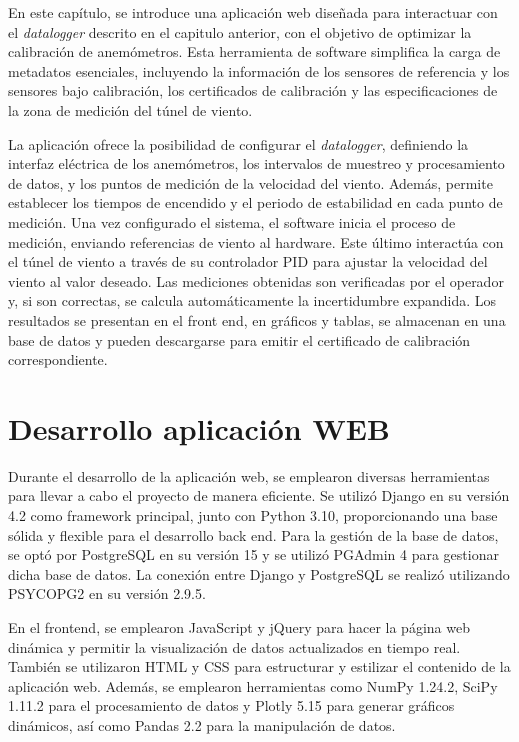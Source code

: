 En este capítulo, se introduce una aplicación web diseñada para interactuar con el \textit{datalogger} descrito en el capitulo anterior, con el objetivo de optimizar la calibración de anemómetros. Esta herramienta de software simplifica la carga de metadatos esenciales, incluyendo la información de los sensores de referencia y los sensores bajo calibración, los certificados de calibración y las especificaciones de la zona de medición del túnel de viento.

La aplicación ofrece la posibilidad de configurar el \textit{datalogger}, definiendo la interfaz eléctrica de los anemómetros, los intervalos de muestreo y procesamiento de datos, y los puntos de medición de la velocidad del viento. Además, permite establecer los tiempos de encendido y el periodo de estabilidad en cada punto de medición. Una vez configurado el sistema, el software inicia el proceso de medición, enviando referencias de viento al hardware. Este último interactúa con el túnel de viento a través de su controlador PID para ajustar la velocidad del viento al valor deseado. Las mediciones obtenidas son verificadas por el operador y, si son correctas, se calcula automáticamente la incertidumbre expandida. Los resultados se presentan en el front end, en gráficos y tablas, se almacenan en una base de datos y pueden descargarse para emitir el certificado de calibración correspondiente.


\section{Desarrollo aplicación WEB}
Durante el desarrollo de la aplicación web, se emplearon diversas herramientas para llevar a cabo el proyecto de manera eficiente. Se utilizó Django en su versión 4.2 como framework principal, junto con Python 3.10, proporcionando una base sólida y flexible para el desarrollo back end. Para la gestión de la base de datos, se optó por PostgreSQL en su versión 15 y se utilizó PGAdmin 4 para gestionar dicha base de datos. La conexión entre Django y PostgreSQL se realizó utilizando PSYCOPG2 en su versión 2.9.5.

En el frontend, se emplearon JavaScript y jQuery para hacer la página web dinámica y permitir la visualización de datos actualizados en tiempo real. También se utilizaron HTML y CSS para estructurar y estilizar el contenido de la aplicación web. Además, se emplearon herramientas como NumPy 1.24.2, SciPy  1.11.2 para el procesamiento de datos y Plotly 5.15 para generar gráficos dinámicos, así como Pandas 2.2 para la manipulación de datos.

